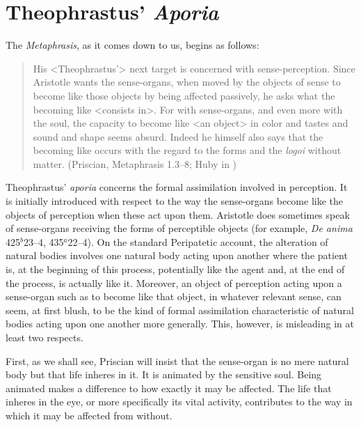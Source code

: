 \documentclass[12pt]{article}
\begin{document}
\section{Theophrastus' \emph{Aporia}} %
\label{sec:theophrastus_emph_aporia}

The \emph{Metaphrasis}, as it comes down to us, begins as follows:
\begin{quote}
	His <Theophrastus'> next target is concerned with sense-perception. Since Aristotle wants the sense-organs, when moved by the objects of sense to become like those objects by being affected passively, he asks what the becoming like <consists in>. For with sense-organs, and even more with the soul, the capacity to become like <an object> in color and tastes and sound and shape seems absurd. Indeed he himself also says that the becoming like occurs with the regard to the forms and the \emph{logoi} without matter. (Priscian, Metaphrasis 1.3--8; Huby in \citealt{Sorabji:1997ly})
\end{quote}

Theophrastus' \emph{aporia} concerns the formal assimilation involved in perception. It is initially introduced with respect to the way the sense-organs become like the objects of perception when these act upon them. Aristotle does sometimes speak of sense-organs receiving the forms of perceptible objects (for example, \emph{De anima} 425\( ^{b} \)23--4, 435\( ^{a} \)22--4). On the standard Peripatetic account, the alteration of natural bodies involves one natural body acting upon another where the patient is, at the beginning of this process, potentially like the agent and, at the end of the process, is actually like it. Moreover, an object of perception acting upon a sense-organ such as to become like that object, in whatever relevant sense, can seem, at first blush, to be the kind of formal assimilation characteristic of natural bodies acting upon one another more generally. This, however, is misleading in at least two respects. 

First, as we shall see, Priscian will insist that the sense-organ is no mere natural body but that life inheres in it. It is animated by the sensitive soul. Being animated makes a difference to how exactly it may be affected. The life that inheres in the eye, or more specifically its vital activity, contributes to the way in which it may be affected from without.
\end{document}
